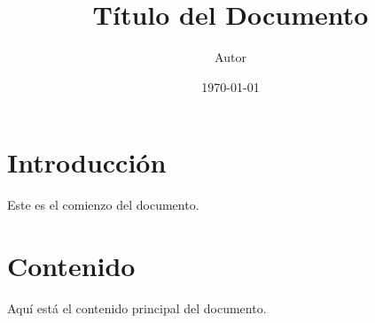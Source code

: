 \documentclass{article}
\begin{document}
\title{Título del Documento}
\author{Autor}
\date{\today}
\maketitle

\section{Introducción}
Este es el comienzo del documento.

\section{Contenido}
Aquí está el contenido principal del documento.
\end{document}

